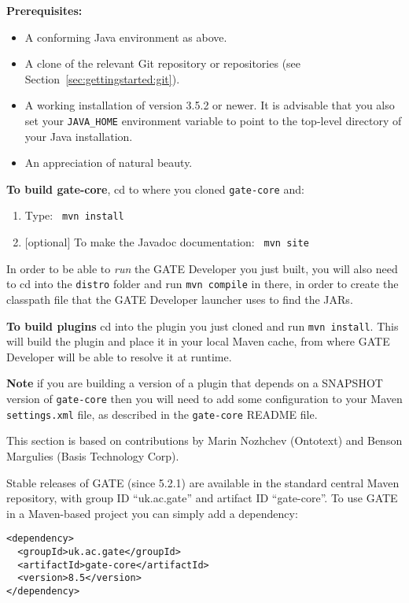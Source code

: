 {\bf Prerequisites:}
\begin{itemize}
\item
A conforming Java environment as above.
\item
A clone of the relevant Git repository or repositories (see Section~\ref{sec:gettingstarted:git}).
\item 
A working installation of  version
3.5.2 or newer. It is advisable that you also set your \verb!JAVA_HOME!
environment variable to point to the top-level directory of your Java
installation.
\item
An appreciation of natural beauty.
\end{itemize}

{\bf To build gate-core}, cd to where you cloned {\tt gate-core} and: 
\begin{enumerate}
\item
Type: {\tt \newline
mvn install
}
\item
$[$optional$]$ To make the Javadoc documentation:
{\tt \newline
mvn site
}
\end{enumerate}

In order to be able to \emph{run} the GATE Developer you just built, you will
also need to cd into the \verb!distro! folder and run \verb!mvn compile! in
there, in order to create the classpath file that the GATE Developer launcher
uses to find the JARs.

{\bf To build plugins} cd into the plugin you just cloned and run
\verb!mvn install!.  This will build the plugin and place it in your local
Maven cache, from where GATE Developer will be able to resolve it at runtime.

{\bf Note} if you are building a version of a plugin that depends on a SNAPSHOT
version of \verb!gate-core! then you will need to add some configuration to
your Maven \verb!settings.xml! file, as described in the \verb!gate-core!
README file.


This section is based on contributions by Marin Nozhchev (Ontotext) and Benson
Margulies (Basis Technology Corp).

Stable releases of GATE (since 5.2.1) are available in the standard central
Maven repository, with group ID ``uk.ac.gate'' and artifact ID ``gate-core''.
To use GATE in a Maven-based project you can simply add a dependency:
\begin{small}
\begin{verbatim}
<dependency>
  <groupId>uk.ac.gate</groupId>
  <artifactId>gate-core</artifactId>
  <version>8.5</version>
</dependency>
\end{verbatim}
\end{small}

